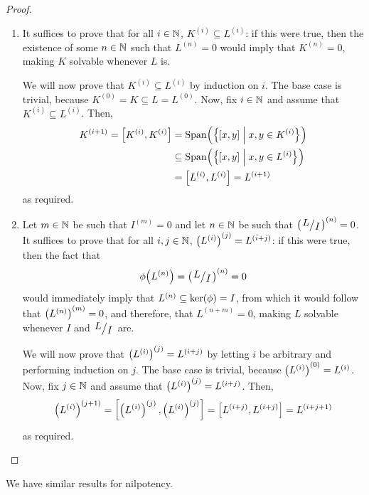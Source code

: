 \begin{proof}
\begin{enumerate}
        \item It suffices to prove that for all $i \in \mathbb{N}$, $K^{(i)} \subseteq L^{(i)}$: if this were true, then the existence of some $n \in \mathbb{N}$ such that $L^{(n)} = 0$ would imply that $K^{(n)} = 0$, making $K$ solvable whenever $L$ is.
        
        We will now prove that $K^{(i)} \subseteq L^{(i)}$ by induction on $i$. The base case is trivial, because $K^{(0)} = K \subseteq L = L^{(0)}$. Now, fix $i \in \mathbb{N}$ and assume that $K^{(i)} \subseteq L^{(i)}$. Then,
        \begin{align*}
            K^{(i + 1)} = \left[ K^{(i)}, K^{(i)} \right]
            &= \operatorname{Span}\!\left( \left\{ \left[ x,y \right] \; \middle\vert \; x, y \in K^{(i)} \right\} \right) \\
            &\subseteq \operatorname{Span}\!\left( \left\{ \left[ x,y \right] \; \middle\vert \; x, y \in L^{(i)} \right\} \right) \\
            &= \left[ L^{(i)}, L^{(i)} \right] = L^{(i + 1)}
        \end{align*}
        as required.

        \item Let $m \in \mathbb{N}$ be such that $I^{(m)} = 0$ and let $n \in \mathbb{N}$ be such that $\parenth{\quotient{L}{I}}^{(n)} = 0$. It suffices to prove that for all $i, j \in \mathbb{N}$, $\left( L^{(i)} \right)^{(j)} = L^{(i + j)}$: if this were true, then the fact that
        \begin{align*}
            \phiof{L^{(n)}} = \parenth{\quotient{L}{I}}^{(n)} = 0
        \end{align*}
        would immediately imply that $L^{(n)} \subseteq \operatorname{ker}\!\left( \phi \right) = I$, from which it would follow that $\left( L^{(n)} \right)^{(m)} = 0$, and therefore, that $L^{(n + m)} = 0$, making $L$ solvable whenever $I$ and $\quotient{L}{I}$ are.

        We will now prove that $\left( L^{(i)} \right)^{(j)} = L^{(i + j)}$ by letting $i$ be arbitrary and performing induction on $j$. The base case is trivial, because $\left( L^{(i)} \right)^{(0)} = L^{(i)}$. Now, fix $j \in \mathbb{N}$ and assume that $\left( L^{(i)} \right)^{(j)} = L^{(i + j)}$. Then,
        \begin{align*}
            \left( L^{(i)} \right)^{(j + 1)} = \left[ \left( L^{(i)} \right)^{(j)}, \left( L^{(i)} \right)^{(j)} \right] = \left[ L^{(i + j)}, L^{(i + j)} \right] = L^{(i + j + 1)}
        \end{align*}
        as required.
    \end{enumerate}
\end{proof}

We have similar results for nilpotency.

